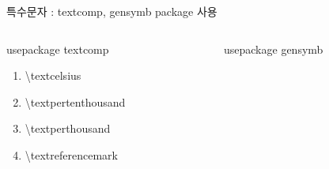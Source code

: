\documentclass[ aspectratio=149,  14pt,blue,xcolor=pdftex,dvipsnames,table,handout,notes]{beamer}
\begin{document}
		\begin{frame}[t]{특수문자 : textcomp, gensymb package 사용 }

			\begin{columns}[t]
			\begin{column}{.4\textwidth}
					\begin{block} { usepackage textcomp }
					\begin{enumerate}
					\item[\textcelsius 		]	\textbackslash textcelsius
					\item[\textpertenthousand	]	\textbackslash textpertenthousand
					\item[\textperthousand		]	\textbackslash textperthousand
					\item[\textreferencemark	]	\textbackslash textreferencemark
					\end{enumerate}
					\end{block}
			\end{column}

			\begin{column}{.4\textwidth}
					\begin{block} { usepackage gensymb}
					\end{block}

			\end{column}
			\end{columns}

		\end{frame}
\end{document}
